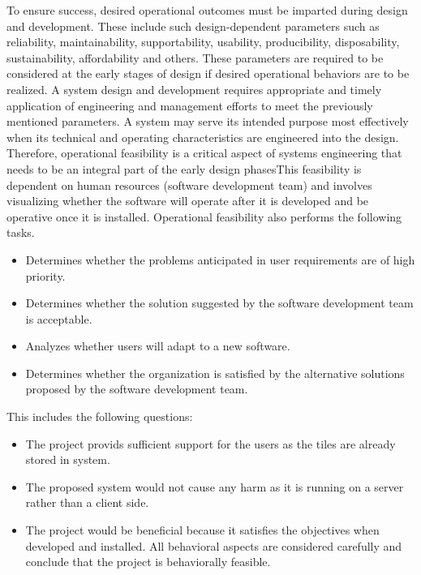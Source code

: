 To ensure success, desired operational outcomes must be imparted during design and development. These include such design-dependent parameters such as reliability, maintainability, supportability, usability, producibility, disposability, sustainability, affordability and others. These parameters are required to be considered at the early stages of design if desired operational behaviors are to be realized. A system design and development requires appropriate and timely application of engineering and management efforts to meet the previously mentioned parameters. A system may serve its intended purpose most effectively when its technical and operating characteristics are engineered into the design. Therefore, operational feasibility is a critical aspect of systems engineering that needs to be an integral part of the early design phasesThis feasibility is dependent on human resources (software development team) and involves visualizing whether the software will operate after it is developed and be operative once it is installed. Operational feasibility also performs the following tasks.\\

\begin{itemize}
	\item Determines whether the problems anticipated in user requirements are of high priority.
	\item Determines whether the solution suggested by the software development team is acceptable.
	\item Analyzes whether users will adapt to a new software.
	\item Determines whether the organization is satisfied by the alternative solutions proposed by the software development team.
\end{itemize}

This includes the following questions:
\begin{itemize}
	\item The project provids sufficient support for the users as the tiles are already stored in system.
	\item The proposed system would not cause any harm as it is running on a server rather than a client side.
	\item The project would be beneficial because it satisfies the objectives when developed and installed. All behavioral aspects are considered carefully and conclude that the project is behaviorally feasible.
\end{itemize}

